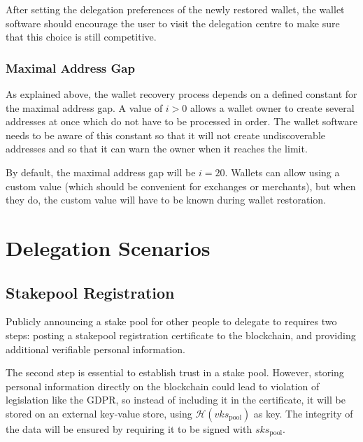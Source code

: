 \documentclass[11pt,a4paper]{article}
\begin{document}
After setting the delegation preferences of the newly restored wallet,
the wallet software should encourage the user to visit the delegation
centre to make sure that this choice is still competitive.

\subsubsection{Maximal Address Gap}
\label{maximal-address-gap}

As explained above, the wallet recovery process depends on a defined
constant for the maximal address gap. A value of \(i>0\) allows a wallet
owner to create several addresses at once which do not have to be
processed in order. The wallet software needs to be aware of this
constant so that it will not create undiscoverable addresses and so that
it can warn the owner when it reaches the limit.

By default, the maximal address gap will be \(i=20\). Wallets can
allow using a custom value (which should be convenient for exchanges
or merchants), but when they do, the custom value will have to be
known during wallet restoration.

\section{Delegation Scenarios}
\label{delegation-scenarios}

\subsection{Stakepool Registration}
\label{stakepool-registration}

Publicly announcing a stake pool for other people to delegate to
requires two steps: posting a stakepool registration certificate to the
blockchain, and providing additional verifiable personal information.

The second step is essential to establish trust in a stake pool.
However, storing personal information directly on the blockchain could
lead to violation of legislation like the GDPR, so instead of including
it in the certificate, it will be stored on an external key-value store,
using \(\mathcal{H}(vks_\text{pool})\) as key. The integrity of the data
will be ensured by requiring it to be signed with \(sks_\text{pool}\).
\end{document}
